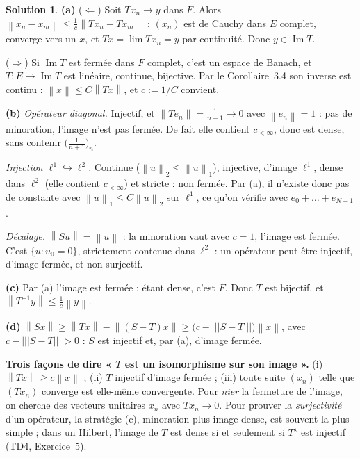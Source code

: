 \documentclass[11pt,a4paper]{article}
\newcommand{\norm}[1]{\left\|#1\right\|}
\newcommand{\opnorm}[1]{|\!|\!|#1|\!|\!|}
\DeclareMathOperator{\Ima}{Im}
\theoremstyle{definition}
\newtheorem*{solution}{Solution}
\begin{document}
\begin{solution}
\noindent\textbf{(a)} ($\Leftarrow$) Soit $Tx_n\to y$ dans $F$. Alors $\norm{x_n-x_m}\le\frac1c\norm{Tx_n-Tx_m}$ : $(x_n)$ est de Cauchy dans $E$ complet, converge vers un $x$, et $Tx=\lim Tx_n=y$ par continuité. Donc $y\in\Ima T$.

($\Rightarrow$) Si $\Ima T$ est fermée dans $F$ complet, c'est un espace de Banach, et $T:E\to\Ima T$ est linéaire, continue, bijective. Par le Corollaire~3.4 son inverse est continu : $\norm x\le C\norm{Tx}$, et $c:=1/C$ convient.

\medskip
\noindent\textbf{(b)} \emph{Opérateur diagonal.} Injectif, et $\norm{Te_n}=\frac1{n+1}\to0$ avec $\norm{e_n}=1$ : pas de minoration, l'image n'est pas fermée. De fait elle contient $c_{<\infty}$, donc est dense, sans contenir $\big(\frac1{n+1}\big)_n$.

\emph{Injection $\ell^1\hookrightarrow\ell^2$.} Continue ($\norm u_2\le\norm u_1$), injective, d'image $\ell^1$, dense dans $\ell^2$ (elle contient $c_{<\infty}$) et stricte : non fermée. Par (a), il n'existe donc pas de constante avec $\norm u_1\le C\norm u_2$ sur $\ell^1$, ce qu'on vérifie avec $e_0+\dots+e_{N-1}$.

\emph{Décalage.} $\norm{Su}=\norm u$ : la minoration vaut avec $c=1$, l'image est fermée. C'est $\{u:u_0=0\}$, strictement contenue dans $\ell^2$ : un opérateur peut être injectif, d'image fermée, et non surjectif.

\medskip
\noindent\textbf{(c)} Par (a) l'image est fermée ; étant dense, c'est $F$. Donc $T$ est bijectif, et $\norm{T^{-1}y}\le\frac1c\norm y$.

\medskip
\noindent\textbf{(d)} $\norm{Sx}\ge\norm{Tx}-\norm{(S-T)x}\ge\big(c-\opnorm{S-T}\big)\norm x$, avec $c-\opnorm{S-T}>0$ : $S$ est injectif et, par (a), d'image fermée.
\end{solution}

\begin{methode}
\textbf{Trois façons de dire « $T$ est un isomorphisme sur son image ».} (i) $\norm{Tx}\ge c\norm x$ ; (ii) $T$ injectif d'image fermée ; (iii) toute suite $(x_n)$ telle que $(Tx_n)$ converge est elle-même convergente. Pour \emph{nier} la fermeture de l'image, on cherche des vecteurs unitaires $x_n$ avec $Tx_n\to0$. Pour prouver la \emph{surjectivité} d'un opérateur, la stratégie (c), minoration plus image dense, est souvent la plus simple ; dans un Hilbert, l'image de $T$ est dense si et seulement si $T^\star$ est injectif (TD4, Exercice~5).
\end{methode}
\end{document}
